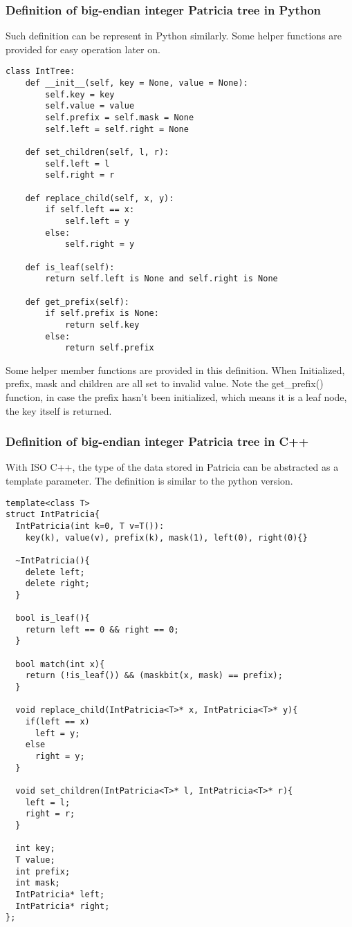 \documentclass{article}
\begin{document}
\subsubsection*{Definition of big-endian integer Patricia tree in Python}
Such definition can be represent in Python similarly. Some helper
functions are provided for easy operation later on.

\lstset{language=Python}
\begin{lstlisting}
class IntTree:
    def __init__(self, key = None, value = None):
        self.key = key
        self.value = value
        self.prefix = self.mask = None
        self.left = self.right = None

    def set_children(self, l, r):
        self.left = l
        self.right = r

    def replace_child(self, x, y):
        if self.left == x:
            self.left = y
        else:
            self.right = y

    def is_leaf(self):
        return self.left is None and self.right is None

    def get_prefix(self):
        if self.prefix is None:
            return self.key
        else:
            return self.prefix
\end{lstlisting}

Some helper member functions are provided in this definition. When
Initialized, prefix, mask and children are all set to invalid value.
Note the get\_prefix() function, in case the prefix hasn't been
initialized, which means it is a leaf node, the key itself is returned.

\subsubsection*{Definition of big-endian integer Patricia tree in C++}

With ISO C++, the type of the data stored in Patricia can be abstracted
as a template parameter. The definition is similar to the python version.

\lstset{language=C++}
\begin{lstlisting}
template<class T>
struct IntPatricia{
  IntPatricia(int k=0, T v=T()): 
    key(k), value(v), prefix(k), mask(1), left(0), right(0){}

  ~IntPatricia(){
    delete left;
    delete right;
  }

  bool is_leaf(){
    return left == 0 && right == 0;
  }

  bool match(int x){
    return (!is_leaf()) && (maskbit(x, mask) == prefix);
  }

  void replace_child(IntPatricia<T>* x, IntPatricia<T>* y){
    if(left == x)
      left = y;
    else
      right = y;
  }

  void set_children(IntPatricia<T>* l, IntPatricia<T>* r){
    left = l;
    right = r;
  }

  int key;
  T value;
  int prefix;
  int mask;
  IntPatricia* left;
  IntPatricia* right;
};
\end{lstlisting}
\end{document}
